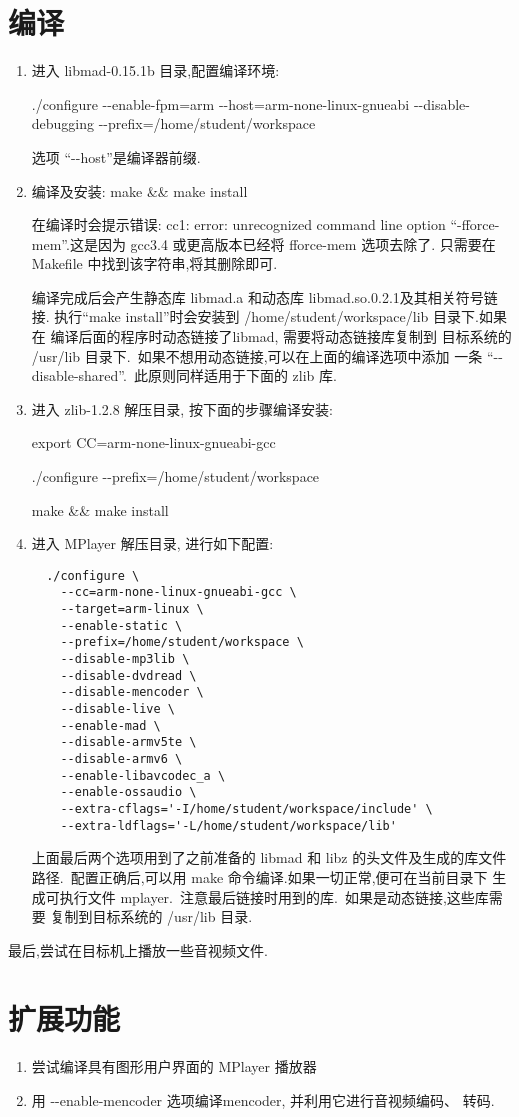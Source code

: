 \section{编译}
\begin{enumerate}
  \item 进入 libmad-0.15.1b 目录,配置编译环境:

	./configure -{}-enable-fpm=arm -{}-host=arm-none-linux-gnueabi
	-{}-disable-debugging -{}-prefix=/home/student/workspace

	选项 ``-{}-host''是编译器前缀.

\item 编译及安装:  make \&\& make install

	在编译时会提示错误: cc1: error: unrecognized command line option
	``-fforce-mem''.这是因为 gcc3.4 或更高版本已经将 fforce-mem 选项去除了.
	只需要在 Makefile 中找到该字符串,将其删除即可.

	编译完成后会产生静态库 libmad.a 和动态库 libmad.so.0.2.1及其相关符号链接.
    执行``make install''时会安装到 /home/student/workspace/lib 目录下.如果在
    编译后面的程序时动态链接了libmad, 需要将动态链接库复制到
	目标系统的 /usr/lib 目录下.~如果不想用动态链接,可以在上面的编译选项中添加
	一条 ``-{}-disable-shared''.~此原则同样适用于下面的 zlib 库.

  \item 进入 zlib-1.2.8 解压目录, 按下面的步骤编译安装:

	export CC=arm-none-linux-gnueabi-gcc

	./configure -{}-prefix=/home/student/workspace

    make \&\& make install

  \item 进入 MPlayer 解压目录, 进行如下配置:
\begin{verbatim}
  ./configure \
    --cc=arm-none-linux-gnueabi-gcc \
    --target=arm-linux \
    --enable-static \
    --prefix=/home/student/workspace \
    --disable-mp3lib \
    --disable-dvdread \
    --disable-mencoder \
    --disable-live \
    --enable-mad \
    --disable-armv5te \
    --disable-armv6 \
    --enable-libavcodec_a \
    --enable-ossaudio \
    --extra-cflags='-I/home/student/workspace/include' \
    --extra-ldflags='-L/home/student/workspace/lib'
    \end{verbatim}
	上面最后两个选项用到了之前准备的 libmad 和 libz 的头文件及生成的库文件
	路径.~配置正确后,可以用 make 命令编译.如果一切正常,便可在当前目录下
	生成可执行文件 mplayer.~注意最后链接时用到的库.~如果是动态链接,这些库需要
	复制到目标系统的 /usr/lib 目录.
\end{enumerate}

	最后,尝试在目标机上播放一些音视频文件.

\section{扩展功能}
\begin{enumerate}
  \item 尝试编译具有图形用户界面的 MPlayer 播放器
  \item 用 -{}-enable-mencoder 选项编译mencoder, 并利用它进行音视频编码、
	转码.
\end{enumerate}
